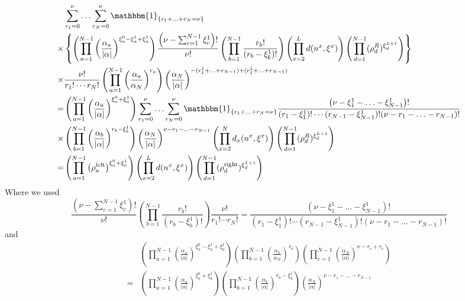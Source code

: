 \documentclass[10pt]{article}
\numberwithin{equation}{section}
\numberwithin{equation}{subsection}
\begin{document}
\begin{align}\label{pezzo1}
	&\sum_{r_{1}=0}^{\nu}\ldots\sum_{r_{N}=0}^{\nu}\mathbbm{1}_{\{r_{1}+\ldots+r_{N}=\nu\}}\nonumber
	\\
	\times&
	\left\{\left(\prod_{a=1}^{N-1}\left(\frac{\alpha_{a}}{|\alpha|}\right)^{\xi_{a}^{0}-\xi_{a}^{1}+\xi_{a}^{1}}\right)\frac{\left(\nu-\sum_{c=1}^{N-1}\xi_{c}^{1}\right)!}{\nu!}\left(\prod_{b=1}^{N-1}\frac{r_{b}!}{(r_{b}-\xi^{1}_{b})!}\right)\left(\prod_{x=2}^{L}d(n^{x},\xi^{x})\right)\left(\prod_{d=1}^{N-1}(\rho_{d}^{R})^{\xi_{d}^{L+1}}\right)\right\}\nonumber\\
	\times	&\frac{\nu!}{r_{1}!\cdots r_{N}!}\left(\prod_{a=1}^{N-1}\left(\frac{\alpha_{a}}{\alpha_{N}}\right)^{r_{a}}\right)\left(\frac{\alpha_{N}}{|\alpha|}\right)^{-(r_{1}^{1}+\ldots+r_{N-1})+(r_{1}^{1}+\ldots+r_{N-1})}\nonumber
	\\=&
	\left(\prod_{a=1}^{N-1}\left(\frac{\alpha_{a}}{|\alpha|}\right)^{\xi_{a}^{0}+\xi_{a}^{1}}\right)\sum_{r_{1}=0}^{\nu}\ldots\sum_{r_{N}=0}^{\nu}\mathbbm{1}_{\{r_{1}+\ldots+r_{N}=\nu\}}	\frac{\left(\nu-\xi_{1}^{1}-\ldots-\xi_{N-1}^{1}\right)!}{(r_{1}-\xi_{1}^{1})!\cdots(r_{N-1}-\xi_{N-1}^{1})!(\nu-r_{1}-\ldots-r_{N-1})!}\nonumber\\
	\times& \left(\prod_{b=1}^{N-1}\left(\frac{\alpha_{b}}{|\alpha|}\right)^{r_{b}-\xi_{b}^{1}}\right)\left(\frac{\alpha_{N}}{|\alpha|}\right)^{\nu-r_{1}-\ldots-r_{N-1}}\left(\prod_{x=2}^{N}d_{x}(n^{x},\xi^{x})\right)\left(\prod_{d=1}^{N-1}(\rho_{d}^{R})^{\xi_{d}^{L+1}}\right)\nonumber
	\\=&
	\left(\prod_{a=1}^{N-1}\left(\rho_{a}^{\text{left}}\right)^{\xi_{a}^{0}+\xi_{a}^{1}}\right)\left(\prod_{x=2}^{L}d(n^{x},\xi^{x})\right)\left(\prod_{d=1}^{N-1}(\rho_{d}^{\text{right}})^{\xi_{d}^{L+1}}\right)
\end{align}
Where we used 
\begin{equation*}
\frac{\left(\nu-\sum_{c=1}^{N-1}\xi_{c}^{1}\right)!}{\nu!}\left(\prod_{b=1}^{N-1}\frac{r_{b}!}{(r_{b}-\xi^{1}_{b})!}\right)\frac{\nu!}{r_{1}!\cdots r_{N}!}=\frac{\left(\nu-\xi_{1}^{1}-\ldots-\xi_{N-1}^{1}\right)!}{(r_{1}-\xi_{1}^{1})!\cdots(r_{N-1}-\xi_{N-1}^{1})!(\nu-r_{1}-\ldots-r_{N-1})!}
\end{equation*}
and 
\begin{align*}
&\left(\prod_{a=1}^{N-1}\left(\frac{\alpha_{a}}{|\alpha|}\right)^{\xi_{a}^{0}-\xi_{a}^{1}+\xi_{a}^{1}}\right)\left(\prod_{b=1}^{N-1}\left(\frac{\alpha_{b}}{\alpha_{N}}\right)^{r_{b}}\right)\left(\prod_{c=1}^{N-1}\left(\frac{\alpha_{N}}{|\alpha|}\right)^{\nu-r_{c}+r_{c}}\right)\\=&	\left(\prod_{a=1}^{N-1}\left(\frac{\alpha_{a}}{|\alpha|}\right)^{\xi_{a}^{0}+\xi_{a}^{1}}\right)\left(\prod_{b=1}^{N-1}\left(\frac{\alpha_{b}}{|\alpha|}\right)^{r_{b}-\xi_{b}^{1}}\right)\left(\frac{\alpha_{N}}{|\alpha|}\right)^{\nu-r_{1}-\ldots-r_{N-1}}
\end{align*}
\end{document}
